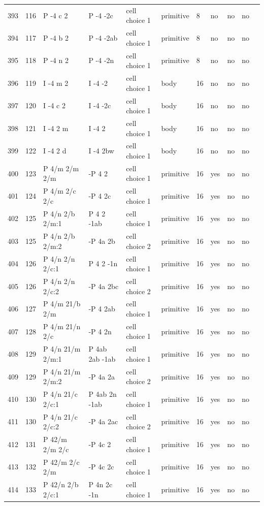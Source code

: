 \begin{center}
\begin{small}
\begin{longtable}{|l|l|l|l|l|l|l|l|l|l|l|}
393 &116 &P -4 c 2 &P -4 -2c &cell choice 1 &primitive &8 &no &no &no \\ 
394 &117 &P -4 b 2 &P -4 -2ab &cell choice 1 &primitive &8 &no &no &no \\ 
395 &118 &P -4 n 2 &P -4 -2n &cell choice 1 &primitive &8 &no &no &no \\ 
396 &119 &I -4 m 2 &I -4 -2 &cell choice 1 &body &16 &no &no &no \\ 
397 &120 &I -4 c 2 &I -4 -2c &cell choice 1 &body &16 &no &no &no \\ 
398 &121 &I -4 2 m &I -4 2 &cell choice 1 &body &16 &no &no &no \\ 
399 &122 &I -4 2 d &I -4 2bw &cell choice 1 &body &16 &no &no &no \\ 
400 &123 &P 4/m 2/m 2/m &-P 4 2 &cell choice 1 &primitive &16 &yes &no &no \\ 
401 &124 &P 4/m 2/c 2/c &-P 4 2c &cell choice 1 &primitive &16 &yes &no &no \\ 
402 &125 &P 4/n 2/b 2/m:1 &P 4 2 -1ab &cell choice 1 &primitive &16 &yes &no &no \\ 
403 &125 &P 4/n 2/b 2/m:2 &-P 4a 2b &cell choice 2 &primitive &16 &yes &no &no \\ 
404 &126 &P 4/n 2/n 2/c:1 &P 4 2 -1n &cell choice 1 &primitive &16 &yes &no &no \\ 
405 &126 &P 4/n 2/n 2/c:2 &-P 4a 2bc &cell choice 2 &primitive &16 &yes &no &no \\ 
406 &127 &P 4/m 21/b 2/m &-P 4 2ab &cell choice 1 &primitive &16 &yes &no &no \\ 
407 &128 &P 4/m 21/n 2/c &-P 4 2n &cell choice 1 &primitive &16 &yes &no &no \\ 
408 &129 &P 4/n 21/m 2/m:1 &P 4ab 2ab -1ab &cell choice 1 &primitive &16 &yes &no &no \\ 
409 &129 &P 4/n 21/m 2/m:2 &-P 4a 2a &cell choice 2 &primitive &16 &yes &no &no \\ 
410 &130 &P 4/n 21/c 2/c:1 &P 4ab 2n -1ab &cell choice 1 &primitive &16 &yes &no &no \\ 
411 &130 &P 4/n 21/c 2/c:2 &-P 4a 2ac &cell choice 2 &primitive &16 &yes &no &no \\ 
412 &131 &P 42/m 2/m 2/c &-P 4c 2 &cell choice 1 &primitive &16 &yes &no &no \\ 
413 &132 &P 42/m 2/c 2/m &-P 4c 2c &cell choice 1 &primitive &16 &yes &no &no \\ 
414 &133 &P 42/n 2/b 2/c:1 &P 4n 2c -1n &cell choice 1 &primitive &16 &yes &no &no \\ 

\end{longtable}
\end{small}
\end{center}

